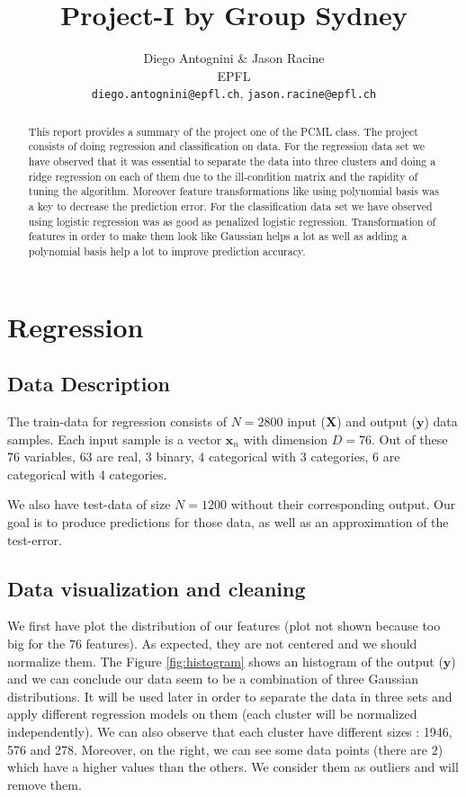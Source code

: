 \documentclass{article} %
\title{Project-I by Group Sydney}
\author{
Diego Antognini \& Jason Racine\\
EPFL \\
\texttt{diego.antognini@epfl.ch}, \texttt{jason.racine@epfl.ch} \\
}
\begin{document}
\maketitle

\begin{abstract}
This report provides a summary of the project one of the PCML class. The project consists of doing regression and classification on data. For the regression data set we have observed that it was essential to separate the data into three clusters and doing a ridge regression on each of them due to the ill-condition matrix and the rapidity of tuning the algorithm. Moreover feature transformations like using polynomial basis was a key to decrease the prediction error. For the classification data set we have observed using logistic regression was as good as penalized logistic regression. Transformation of features in order to make them look like Gaussian helps a lot as well as adding a polynomial basis help a lot to improve prediction accuracy.
\end{abstract}

\section{Regression}

\subsection{Data Description}

The train-data for regression consists of $N = 2800$ input ($\mathbf{X}$) and output ($\mathbf{y}$) data samples. Each input sample is a vector $\mathbf{x}_n$ with dimension $D = 76$. Out of these $76$ variables, $63$ are real, $3$ binary, $4$ categorical with 3 categories, $6$ are categorical with 4 categories.

We also have test-data of size $N=1200$ without their corresponding output. Our goal is to produce predictions for those data, as well as an approximation of the test-error.

\subsection{Data visualization and cleaning}

We first have plot the distribution of our features (plot not shown because too big for the $76$ features). As expected, they are not centered and we should normalize them. The Figure \ref{fig:histogram} shows an histogram of the output ($\mathbf{y}$) and we can conclude our data  seem to be a combination of three Gaussian distributions. It will be used later in order to separate the data in three sets and apply different regression models on them (each cluster will be normalized independently). We can also observe that each cluster have different sizes : 1946, 576 and 278. Moreover, on the right, we can see some data points (there are $2$) which have a higher values than the others. We consider them as outliers and will remove them.
\end{document}
